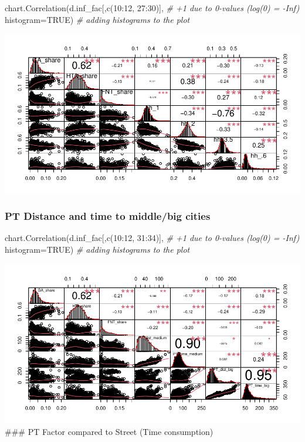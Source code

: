 \documentclass[
]{article}
\newenvironment{Shaded}{\begin{snugshade}}{\end{snugshade}}
\newcommand{\AttributeTok}[1]{\textcolor[rgb]{0.77,0.63,0.00}{#1}}
\newcommand{\CommentTok}[1]{\textcolor[rgb]{0.56,0.35,0.01}{\textit{#1}}}
\newcommand{\ConstantTok}[1]{\textcolor[rgb]{0.00,0.00,0.00}{#1}}
\newcommand{\DecValTok}[1]{\textcolor[rgb]{0.00,0.00,0.81}{#1}}
\newcommand{\FunctionTok}[1]{\textcolor[rgb]{0.00,0.00,0.00}{#1}}
\newcommand{\NormalTok}[1]{#1}
\newcommand{\SpecialCharTok}[1]{\textcolor[rgb]{0.00,0.00,0.00}{#1}}
\begin{document}
\begin{Shaded}
\begin{Highlighting}[]
\FunctionTok{chart.Correlation}\NormalTok{(d.inf\_fac[,}\FunctionTok{c}\NormalTok{(}\DecValTok{10}\SpecialCharTok{:}\DecValTok{12}\NormalTok{, }\DecValTok{27}\SpecialCharTok{:}\DecValTok{30}\NormalTok{)], }\CommentTok{\# +1 due to 0{-}values (log(0) = {-}Inf)}
                  \AttributeTok{histogram=}\ConstantTok{TRUE}\NormalTok{) }\CommentTok{\# adding histograms to the plot}
\end{Highlighting}
\end{Shaded}

\includegraphics{Lin_Mod_Clus_Analysis_files/figure-latex/unnamed-chunk-11-1.pdf}

\hypertarget{pt-distance-and-time-to-middlebig-cities}{%
\subsubsection{PT Distance and time to middle/big
cities}\label{pt-distance-and-time-to-middlebig-cities}}

\begin{Shaded}
\begin{Highlighting}[]
\FunctionTok{chart.Correlation}\NormalTok{(d.inf\_fac[,}\FunctionTok{c}\NormalTok{(}\DecValTok{10}\SpecialCharTok{:}\DecValTok{12}\NormalTok{, }\DecValTok{31}\SpecialCharTok{:}\DecValTok{34}\NormalTok{)], }\CommentTok{\# +1 due to 0{-}values (log(0) = {-}Inf)}
                  \AttributeTok{histogram=}\ConstantTok{TRUE}\NormalTok{) }\CommentTok{\# adding histograms to the plot}
\end{Highlighting}
\end{Shaded}

\includegraphics{Lin_Mod_Clus_Analysis_files/figure-latex/unnamed-chunk-12-1.pdf}
\#\#\# PT Factor compared to Street (Time consumption)
\end{document}
